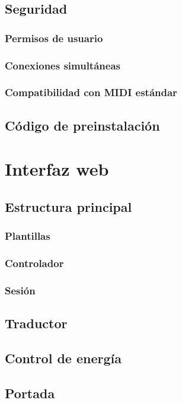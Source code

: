 \subsection{Seguridad}
\subsubsection{Permisos de usuario}
\subsubsection{Conexiones simultáneas}
\subsubsection{Compatibilidad con MIDI estándar}

\subsection{Código de preinstalación}

\section{Interfaz web}

\subsection{Estructura principal}
\subsubsection{Plantillas}
\subsubsection{Controlador}
\subsubsection{Sesión}

\subsection{Traductor}

\subsection{Control de energía}

\subsection{Portada}
